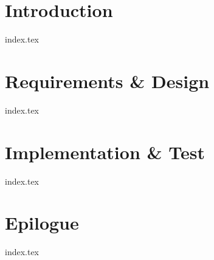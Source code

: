 \part{Introduction}
{index.tex}
\part{Requirements \& Design}
{index.tex}
\part{Implementation \& Test}\label{part:implementation}
{index.tex}
\part{Epilogue}
{index.tex}

